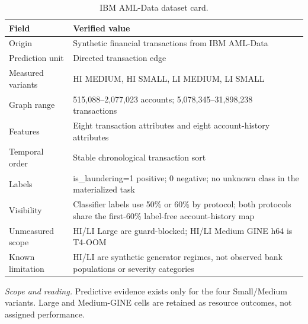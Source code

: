 \begin{table}[tbp]
\centering
\footnotesize
\setlength{\tabcolsep}{3.2pt}
\renewcommand{\arraystretch}{1.12}
\caption{IBM AML-Data dataset card.}
\label{tab:s-dataset-ibm}
\begin{tabularx}{\textwidth}{@{}>{\raggedright\arraybackslash}p{} Y@{}}
\toprule
\textbf{Field} & \textbf{Verified value} \\
\midrule
Origin & Synthetic financial transactions from IBM AML-Data \\
Prediction unit & Directed transaction edge \\
Measured variants & HI MEDIUM, HI SMALL, LI MEDIUM, LI SMALL \\
Graph range & 515,088--2,077,023 accounts; 5,078,345--31,898,238 transactions \\
Features & Eight transaction attributes and eight account-history attributes \\
Temporal order & Stable chronological transaction sort \\
Labels & is\_laundering=1 positive; 0 negative; no unknown class in the materialized task \\
Visibility & Classifier labels use 50\% or 60\% by protocol; both protocols share the first-60\% label-free account-history map \\
Unmeasured scope & HI/LI Large are guard-blocked; HI/LI Medium GINE h64 is T4-OOM \\
Known limitation & HI/LI are synthetic generator regimes, not observed bank populations or severity categories \\
\bottomrule
\end{tabularx}
\vspace{2pt}
\begin{minipage}{\textwidth}\footnotesize\emph{Scope and reading.} Predictive evidence exists only for the four Small/Medium variants. Large and Medium-GINE cells are retained as resource outcomes, not assigned performance.\end{minipage}
\end{table}
